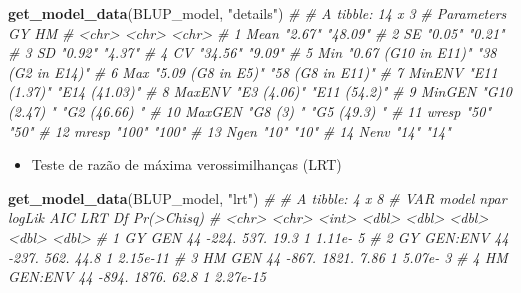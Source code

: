 \documentclass[
]{book}
\newenvironment{Shaded}{\begin{snugshade}}{\end{snugshade}}
\newcommand{\CommentTok}[1]{\textcolor[rgb]{0.56,0.35,0.01}{\textit{#1}}}
\newcommand{\KeywordTok}[1]{\textcolor[rgb]{0.13,0.29,0.53}{\textbf{#1}}}
\newcommand{\NormalTok}[1]{#1}
\newcommand{\StringTok}[1]{\textcolor[rgb]{0.31,0.60,0.02}{#1}}
\providecommand{\tightlist}{%
  \setlength{\itemsep}{0pt}\setlength{\parskip}{0pt}}
\numberwithin{equation}{section}
\begin{document}
\begin{Shaded}
\begin{Highlighting}[]
\KeywordTok{get\_model\_data}\NormalTok{(BLUP\_model, }\StringTok{"details"}\NormalTok{)}
\CommentTok{\# \# A tibble: 14 x 3}
\CommentTok{\#    Parameters GY                  HM              }
\CommentTok{\#    \textless{}chr\textgreater{}      \textless{}chr\textgreater{}               \textless{}chr\textgreater{}           }
\CommentTok{\#  1 Mean       "2.67"              "48.09"         }
\CommentTok{\#  2 SE         "0.05"              "0.21"          }
\CommentTok{\#  3 SD         "0.92"              "4.37"          }
\CommentTok{\#  4 CV         "34.56"             "9.09"          }
\CommentTok{\#  5 Min        "0.67 (G10 in E11)" "38 (G2 in E14)"}
\CommentTok{\#  6 Max        "5.09 (G8 in E5)"   "58 (G8 in E11)"}
\CommentTok{\#  7 MinENV     "E11 (1.37)"        "E14 (41.03)"   }
\CommentTok{\#  8 MaxENV     "E3 (4.06)"         "E11 (54.2)"    }
\CommentTok{\#  9 MinGEN     "G10 (2.47) "       "G2 (46.66) "   }
\CommentTok{\# 10 MaxGEN     "G8 (3) "           "G5 (49.3) "    }
\CommentTok{\# 11 wresp      "50"                "50"            }
\CommentTok{\# 12 mresp      "100"               "100"           }
\CommentTok{\# 13 Ngen       "10"                "10"            }
\CommentTok{\# 14 Nenv       "14"                "14"}
\end{Highlighting}
\end{Shaded}

\begin{itemize}
\tightlist
\item
  Teste de razão de máxima verossimilhanças (LRT)
\end{itemize}

\begin{Shaded}
\begin{Highlighting}[]
\KeywordTok{get\_model\_data}\NormalTok{(BLUP\_model, }\StringTok{"lrt"}\NormalTok{)}
\CommentTok{\# \# A tibble: 4 x 8}
\CommentTok{\#   VAR   model    npar logLik   AIC   LRT    Df \textasciigrave{}Pr(\textgreater{}Chisq)\textasciigrave{}}
\CommentTok{\#   \textless{}chr\textgreater{} \textless{}chr\textgreater{}   \textless{}int\textgreater{}  \textless{}dbl\textgreater{} \textless{}dbl\textgreater{} \textless{}dbl\textgreater{} \textless{}dbl\textgreater{}        \textless{}dbl\textgreater{}}
\CommentTok{\# 1 GY    GEN        44  {-}224.  537. 19.3      1     1.11e{-} 5}
\CommentTok{\# 2 GY    GEN:ENV    44  {-}237.  562. 44.8      1     2.15e{-}11}
\CommentTok{\# 3 HM    GEN        44  {-}867. 1821.  7.86     1     5.07e{-} 3}
\CommentTok{\# 4 HM    GEN:ENV    44  {-}894. 1876. 62.8      1     2.27e{-}15}
\end{Highlighting}
\end{Shaded}
\end{document}
